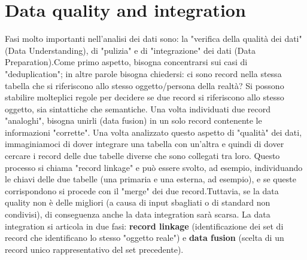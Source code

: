 \documentclass[a4page, 11pt]{article}
\begin{document}
\section{Data quality and integration}
Fasi molto importanti nell'analisi dei dati sono: la "verifica della qualità dei dati" (Data Understanding), di "pulizia" e di "integrazione" dei dati (Data Preparation).\newline Come primo aspetto, bisogna concentrarsi sui casi di "deduplication"; in altre parole bisogna chiedersi: ci sono record nella stessa tabella che si riferiscono allo stesso oggetto/persona della realtà? Si possono stabilire molteplici regole per decidere se due record si riferiscono allo stesso oggetto, sia sintattiche che semantiche. Una volta individuati due record "analoghi", bisogna unirli (data fusion) in un solo record contenente le informazioni "corrette". Una volta analizzato questo aspetto di "qualità" dei dati, immaginiamoci di dover integrare una tabella con un’altra e quindi di dover cercare i record delle due tabelle diverse che sono collegati tra loro. Questo processo si chiama "record linkage" e può essere svolto, ad esempio, individuando le chiavi delle due tabelle (una primaria e una esterna, ad esempio), e se queste corrispondono si procede con il "merge" dei due record.\newline Tuttavia, se la data quality non è delle migliori (a causa di input sbagliati o di standard non condivisi), di conseguenza anche la data integration sarà scarsa.\newline
La data integration si articola in due fasi: \textbf{record linkage} (identificazione dei set di record che identificano lo stesso "oggetto reale") e \textbf{data fusion} (scelta di un record unico rappresentativo del set precedente).
\end{document}
